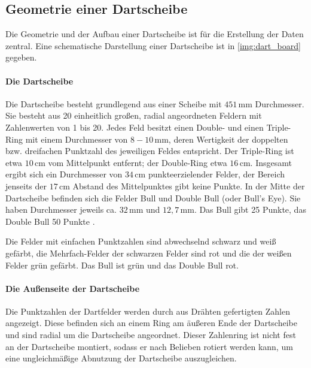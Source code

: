 
\subsection{Geometrie einer Dartscheibe}  %
\label{sec:dartscheiben_geometrie}

Die Geometrie und der Aufbau einer Dartscheibe ist für die Erstellung der Daten zentral. Eine schematische Darstellung einer Dartscheibe ist in \autoref{img:dart_board} gegeben.

\paragraph{Die Dartscheibe}

Die Dartscheibe besteht grundlegend aus einer Scheibe mit $451\,\text{mm}$ Durchmesser. Sie besteht aus 20 einheitlich großen, radial angeordneten Feldern mit Zahlenwerten von 1 bis 20. Jedes Feld besitzt einen Double- und einen Triple-Ring mit einem Durchmesser von $8-10\,\text{mm}$, deren Wertigkeit der doppelten bzw. dreifachen Punktzahl des jeweiligen Feldes entspricht. Der Triple-Ring ist etwa $10\,\text{cm}$ vom Mittelpunkt entfernt; der Double-Ring etwa $16\,\text{cm}$. Insgesamt ergibt sich ein Durchmesser von $34\,\text{cm}$ punkteerzielender Felder, der Bereich jenseits der $17\,\text{cm}$ Abstand des Mittelpunktes gibt keine Punkte. In der Mitte der Dartscheibe befinden sich die Felder Bull und Double Bull (oder Bull's Eye). Sie haben Durchmesser jeweils ca. $32\,\text{mm}$ und $12,7\,\text{mm}$. Das Bull gibt 25 Punkte, das Double Bull 50 Punkte \cite{wdf-rules}.

Die Felder mit einfachen Punktzahlen sind abwechselnd schwarz und weiß gefärbt, die Mehrfach-Felder der schwarzen Felder sind rot und die der weißen Felder grün gefärbt. Das Bull ist grün und das Double Bull rot.

\paragraph{Die Außenseite der Dartscheibe}

Die Punktzahlen der Dartfelder werden durch aus Drähten gefertigten Zahlen angezeigt. Diese befinden sich an einem Ring am äußeren Ende der Dartscheibe und sind radial um die Dartscheibe angeordnet. Dieser Zahlenring ist nicht fest an der Dartscheibe montiert, sodass er nach Belieben rotiert werden kann, um eine ungleichmäßige Abnutzung der Dartscheibe auszugleichen.

